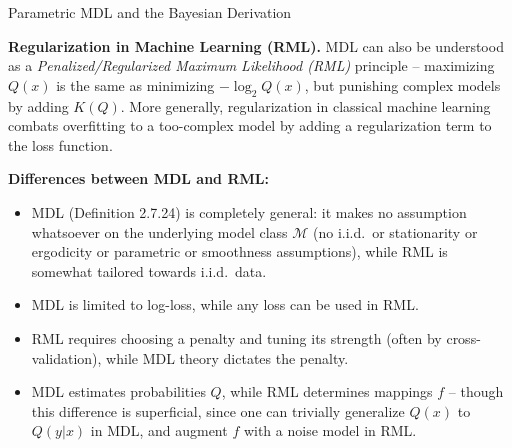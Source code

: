 \documentclass[aspectratio=169,10pt]{beamer}
\begin{document}
\begin{frame}[allowframebreaks]{Parametric MDL and the Bayesian Derivation}
  \framebreak

  \textbf{Regularization in Machine Learning (RML).} MDL can also be
  understood as a \emph{Penalized/Regularized Maximum Likelihood (RML)}
  principle -- maximizing $Q(x)$ is the same as minimizing $-\log_2Q(x)$,
  but punishing complex models by adding $K(Q)$. More generally,
  regularization in classical machine learning combats overfitting to a
  too-complex model by adding a regularization term to the loss function.

  \medskip
  \textbf{Differences between MDL and RML:}
  \begin{itemize}
    \item MDL (Definition 2.7.24) is completely general: it makes no
      assumption whatsoever on the underlying model class $\mathcal{M}$
      (no i.i.d.\ or stationarity or ergodicity or parametric or
      smoothness assumptions), while RML is somewhat tailored towards
      i.i.d.\ data.
    \item MDL is limited to log-loss, while any loss can be used in RML.
    \item RML requires choosing a penalty and tuning its strength (often
      by cross-validation), while MDL theory dictates the penalty.
    \item MDL estimates probabilities $Q$, while RML determines mappings
      $f$ -- though this difference is superficial, since one can
      trivially generalize $Q(x)$ to $Q(y|x)$ in MDL, and augment $f$
      with a noise model in RML.
  \end{itemize}
\end{frame}
\end{document}
